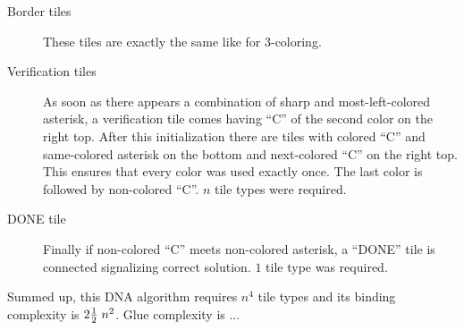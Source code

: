 \begin{description}
\begin{description}
	\end{description}
	\item[Border tiles] These tiles are exactly the same like for 3-coloring.
	\item[Verification tiles] As soon as there appears a combination of sharp and most-left-colored asterisk, a verification tile comes having ``C'' of the second color on the right top. After this initialization there are tiles with colored ``C'' and same-colored asterisk on the bottom and next-colored ``C'' on the right top. This ensures that every color was used exactly once. The last color is followed by non-colored ``C''. $n$ tile types were required.
	\item[DONE tile] Finally if non-colored ``C'' meets non-colored asterisk, a ``DONE'' tile is connected signalizing correct solution. $1$ tile type was required.
\end{description}
Summed up, this DNA algorithm requires $n^4$ tile types and its binding complexity is $2\nicefrac{1}{2}\;n^2$. Glue complexity is ...


